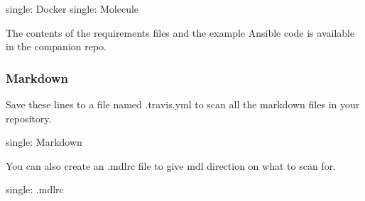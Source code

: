 single: Docker single: Molecule

\begin{Shaded}
\begin{Highlighting}[]
\OtherTok{---}
\AttributeTok{ }
  \KeywordTok{-}
  \KeywordTok{-} 
  \KeywordTok{-} 
  \KeywordTok{-}
  \KeywordTok{-}
  \KeywordTok{-}
  \KeywordTok{-}
\AttributeTok{ }
  \KeywordTok{-}
\end{Highlighting}
\end{Shaded}

The contents of the requirements files and the example Ansible code is
available in the companion repo.

\hypertarget{markdown-1}{%
\subsubsection{Markdown}\label{markdown-1}}

Save these lines to a file named .travis.yml to scan all the markdown
files in your repository.

single: Markdown

\begin{Shaded}
\begin{Highlighting}[]
\OtherTok{---}
  \KeywordTok{-}
  \KeywordTok{-}
  \KeywordTok{-}
  \KeywordTok{-}
\end{Highlighting}
\end{Shaded}

You can also create an .mdlrc file to give mdl direction on what to scan
for.

single: .mdlrc

